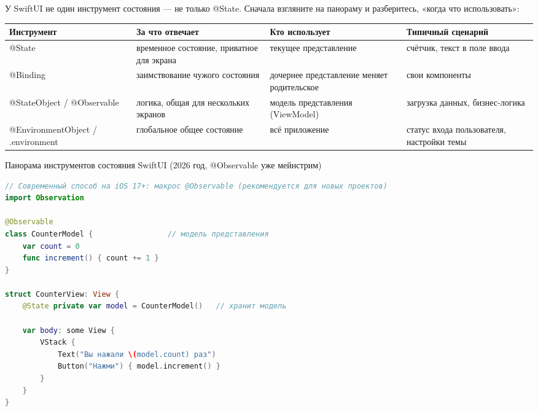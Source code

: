 


У SwiftUI не один инструмент состояния — не только @State. Сначала взгляните на панораму и разберитесь, «когда что использовать»:

\begin{center}
\begin{tabularx}{\linewidth}{|X|X|X|X|}
\hline
\textbf{Инструмент} & \textbf{За что отвечает} & \textbf{Кто использует} & \textbf{Типичный сценарий} \tabularnewline
\hline
@State & временное состояние, приватное для экрана & текущее представление & счётчик, текст в поле ввода \tabularnewline
@Binding & заимствование чужого состояния & дочернее представление меняет родительское & свои компоненты \tabularnewline
@StateObject / @Observable & логика, общая для нескольких экранов & модель представления (ViewModel) & загрузка данных, бизнес-логика \tabularnewline
@EnvironmentObject / .environment & глобальное общее состояние & всё приложение & статус входа пользователя, настройки темы \tabularnewline
\hline
\end{tabularx}
\end{center}

\begin{center}\small\color{gray}Панорама инструментов состояния SwiftUI (2026 год, @Observable уже мейнстрим)\end{center}

\begin{lstlisting}[language=Swift]
// Современный способ на iOS 17+: макрос @Observable (рекомендуется для новых проектов)
import Observation

@Observable
class CounterModel {                 // модель представления
    var count = 0
    func increment() { count += 1 }
}

struct CounterView: View {
    @State private var model = CounterModel()   // хранит модель

    var body: some View {
        VStack {
            Text("Вы нажали \(model.count) раз")
            Button("Нажми") { model.increment() }
        }
    }
}
\end{lstlisting}

